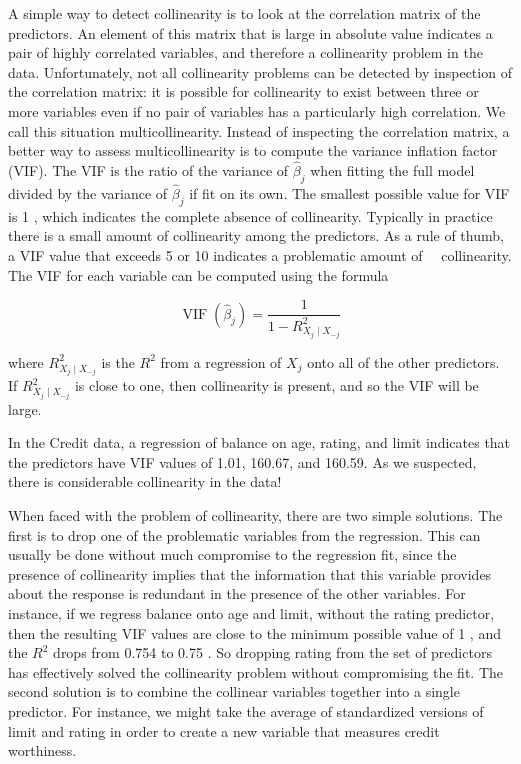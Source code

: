 \documentclass[10pt]{article}
\begin{document}
A simple way to detect collinearity is to look at the correlation matrix of the predictors. An element of this matrix that is large in absolute value indicates a pair of highly correlated variables, and therefore a collinearity problem in the data. Unfortunately, not all collinearity problems can be detected by inspection of the correlation matrix: it is possible for collinearity to exist between three or more variables even if no pair of variables has a particularly high correlation. We call this situation multicollinearity. Instead of inspecting the correlation matrix, a better way to assess multicollinearity is to compute the variance inflation factor (VIF). The VIF is the ratio of the variance of $\hat{\beta}_{j}$ when fitting the full model divided by the variance of $\hat{\beta}_{j}$ if fit on its own. The smallest possible value for VIF is 1 , which indicates the complete absence of collinearity. Typically in practice there is a small amount of collinearity among the predictors. As a rule of thumb, a VIF value that exceeds 5 or 10 indicates a problematic amount of\
\
collinearity. The VIF for each variable can be computed using the formula

$$
\operatorname{VIF}\left(\hat{\beta}_{j}\right)=\frac{1}{1-R_{X_{j} \mid X_{-j}}^{2}}
$$

where $R_{X_{j} \mid X_{-j}}^{2}$ is the $R^{2}$ from a regression of $X_{j}$ onto all of the other predictors. If $R_{X_{j} \mid X_{-j}}^{2}$ is close to one, then collinearity is present, and so the VIF will be large.

In the Credit data, a regression of balance on age, rating, and limit indicates that the predictors have VIF values of 1.01, 160.67, and 160.59. As we suspected, there is considerable collinearity in the data!

When faced with the problem of collinearity, there are two simple solutions. The first is to drop one of the problematic variables from the regression. This can usually be done without much compromise to the regression fit, since the presence of collinearity implies that the information that this variable provides about the response is redundant in the presence of the other variables. For instance, if we regress balance onto age and limit, without the rating predictor, then the resulting VIF values are close to the minimum possible value of 1 , and the $R^{2}$ drops from 0.754 to 0.75 . So dropping rating from the set of predictors has effectively solved the collinearity problem without compromising the fit. The second solution is to combine the collinear variables together into a single predictor. For instance, we might take the average of standardized versions of limit and rating in order to create a new variable that measures credit worthiness.
\end{document}
